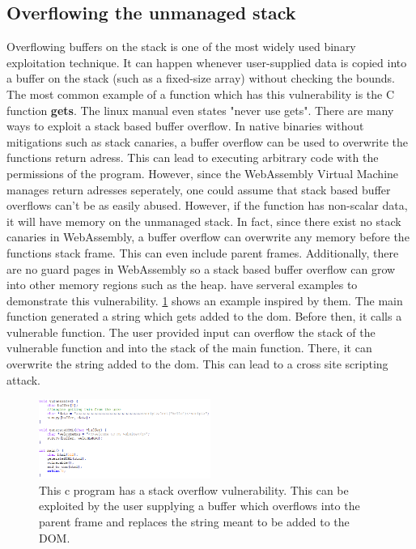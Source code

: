 \documentclass[sigconf]{acmart}
\begin{document}
\subsection{Overflowing the unmanaged stack}
\label{sec:stack_buffer_overflow}
Overflowing buffers on the stack is one of the most widely used binary exploitation technique. It can happen whenever user-supplied data is copied into a buffer on the stack (such as a fixed-size array) without checking the bounds. The most common example of a function which has this vulnerability is the C function \textbf{gets}. The linux manual even states "never use gets". There are many ways to exploit a stack based buffer overflow. In native binaries without mitigations such as stack canaries, a buffer overflow can be used to overwrite the functions return adress. This can lead to executing arbitrary code with the permissions of the program. However, since the WebAssembly Virtual Machine manages return adresses seperately, one could assume that stack based buffer overflows can't be as easily abused. However, if the function has non-scalar data, it will have memory on the unmanaged stack. In fact, since there exist no stack canaries in WebAssembly, a buffer overflow can overwrite any memory before the functions stack frame. This can even include parent frames. Additionally, there are no guard pages in WebAssembly so a stack based buffer overflow can grow into other memory regions such as the heap. \cite{lehmann_everything_2020} have serveral examples to demonstrate this vulnerability. \ref{fig:vuln_example_stack_overflow} shows an example inspired by them. The main function generated a string which gets added to the dom. Before then, it calls a vulnerable function. The user provided input can overflow the stack of the vulnerable function and into the stack of the main function. There, it can overwrite the string added to the dom. This can lead to a cross site scripting attack.

\begin{figure}[h]
  \centering
  \includegraphics[width=0.5\textwidth]{stack_buffer_overflow}
  \caption{This c program has a stack overflow vulnerability. This can be exploited by the user supplying a buffer which overflows into the parent frame and replaces the string meant to be added to the DOM.}  
\label{fig:vuln_example_stack_overflow}
\end{figure}
\end{document}
